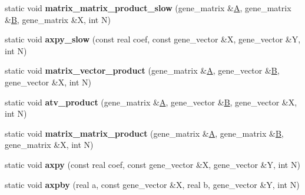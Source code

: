\begin{DoxyCompactItemize}
static void {\bfseries matrix\+\_\+matrix\+\_\+product\+\_\+slow} (gene\+\_\+matrix \&\hyperlink{group___core___module_class_eigen_1_1_matrix}{A}, gene\+\_\+matrix \&\hyperlink{group___core___module_class_eigen_1_1_matrix}{B}, gene\+\_\+matrix \&X, int N)
\item 
\mbox{\label{classublas__interface_a2d6f83cc3d827e6e0d261b0f6f0fc225}} 
static void {\bfseries axpy\+\_\+slow} (const real coef, const gene\+\_\+vector \&X, gene\+\_\+vector \&Y, int N)
\item 
\mbox{\label{classublas__interface_a26e6c848c18676daf943250597f766c8}} 
static void {\bfseries matrix\+\_\+vector\+\_\+product} (gene\+\_\+matrix \&\hyperlink{group___core___module_class_eigen_1_1_matrix}{A}, gene\+\_\+vector \&\hyperlink{group___core___module_class_eigen_1_1_matrix}{B}, gene\+\_\+vector \&X, int N)
\item 
\mbox{\label{classublas__interface_a4dbd7324c682015d070141403b0710b8}} 
static void {\bfseries atv\+\_\+product} (gene\+\_\+matrix \&\hyperlink{group___core___module_class_eigen_1_1_matrix}{A}, gene\+\_\+vector \&\hyperlink{group___core___module_class_eigen_1_1_matrix}{B}, gene\+\_\+vector \&X, int N)
\item 
\mbox{\label{classublas__interface_ae931b23f3823fdd23dc3ef0feba08812}} 
static void {\bfseries matrix\+\_\+matrix\+\_\+product} (gene\+\_\+matrix \&\hyperlink{group___core___module_class_eigen_1_1_matrix}{A}, gene\+\_\+matrix \&\hyperlink{group___core___module_class_eigen_1_1_matrix}{B}, gene\+\_\+matrix \&X, int N)
\item 
\mbox{\label{classublas__interface_acc36f0db678070ed64c4565b6a7638b2}} 
static void {\bfseries axpy} (const real coef, const gene\+\_\+vector \&X, gene\+\_\+vector \&Y, int N)
\item 
\mbox{\label{classublas__interface_a6d2438d82e457ed5550bc3df57e660a4}} 
static void {\bfseries axpby} (real a, const gene\+\_\+vector \&X, real b, gene\+\_\+vector \&Y, int N)
\item 
\mbox{\label{classublas__interface_a89da1b812a6df68e9833db1449670178}} 

\end{DoxyCompactItemize}
